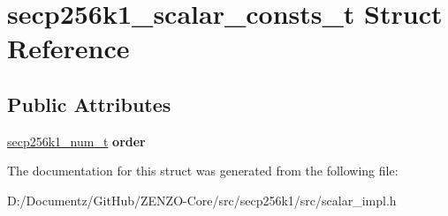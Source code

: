 \hypertarget{structsecp256k1__scalar__consts__t}{}\section{secp256k1\+\_\+scalar\+\_\+consts\+\_\+t Struct Reference}
\label{structsecp256k1__scalar__consts__t}
\subsection*{Public Attributes}
\begin{DoxyCompactItemize}
\item 
\mbox{\label{structsecp256k1__scalar__consts__t_afe571b5fdc44a3ea42bfb9a5409a7ea4}} 
\mbox{\hyperlink{structsecp256k1__num__t}{secp256k1\+\_\+num\+\_\+t}} {\bfseries order}
\end{DoxyCompactItemize}


The documentation for this struct was generated from the following file\+:\begin{DoxyCompactItemize}
\item 
D\+:/\+Documentz/\+Git\+Hub/\+Z\+E\+N\+Z\+O-\/\+Core/src/secp256k1/src/scalar\+\_\+impl.\+h\end{DoxyCompactItemize}
